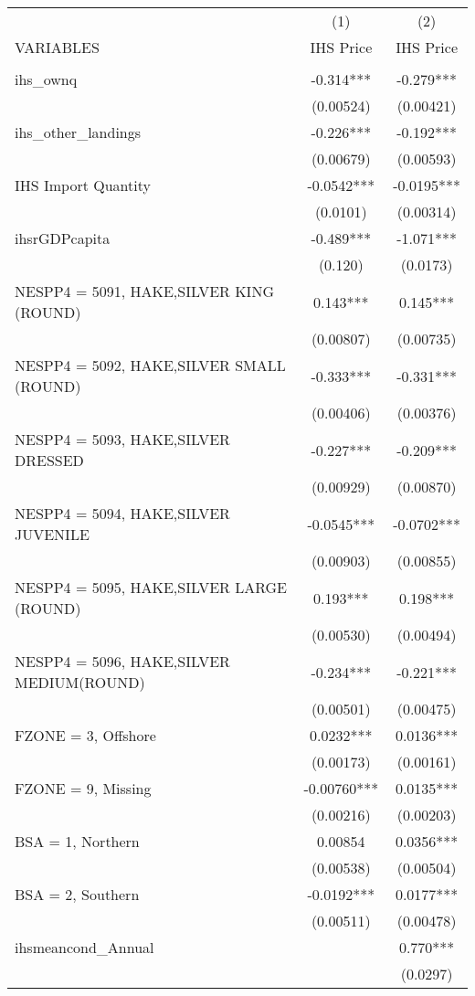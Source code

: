 \begin{tabular}{lcc} \hline
 & (1) & (2) \\
VARIABLES & IHS Price & IHS Price \\ \hline
 &  &  \\
ihs\_ownq & -0.314*** & -0.279*** \\
 & (0.00524) & (0.00421) \\
ihs\_other\_landings & -0.226*** & -0.192*** \\
 & (0.00679) & (0.00593) \\
IHS Import Quantity & -0.0542*** & -0.0195*** \\
 & (0.0101) & (0.00314) \\
ihsrGDPcapita & -0.489*** & -1.071*** \\
 & (0.120) & (0.0173) \\
NESPP4 = 5091, HAKE,SILVER KING (ROUND) & 0.143*** & 0.145*** \\
 & (0.00807) & (0.00735) \\
NESPP4 = 5092, HAKE,SILVER SMALL (ROUND) & -0.333*** & -0.331*** \\
 & (0.00406) & (0.00376) \\
NESPP4 = 5093, HAKE,SILVER DRESSED & -0.227*** & -0.209*** \\
 & (0.00929) & (0.00870) \\
NESPP4 = 5094, HAKE,SILVER JUVENILE & -0.0545*** & -0.0702*** \\
 & (0.00903) & (0.00855) \\
NESPP4 = 5095, HAKE,SILVER LARGE (ROUND) & 0.193*** & 0.198*** \\
 & (0.00530) & (0.00494) \\
NESPP4 = 5096, HAKE,SILVER MEDIUM(ROUND) & -0.234*** & -0.221*** \\
 & (0.00501) & (0.00475) \\
FZONE = 3, Offshore & 0.0232*** & 0.0136*** \\
 & (0.00173) & (0.00161) \\
FZONE = 9, Missing & -0.00760*** & 0.0135*** \\
 & (0.00216) & (0.00203) \\
BSA = 1, Northern & 0.00854 & 0.0356*** \\
 & (0.00538) & (0.00504) \\
BSA = 2, Southern & -0.0192*** & 0.0177*** \\
 & (0.00511) & (0.00478) \\
ihsmeancond\_Annual &  & 0.770*** \\
 &  & (0.0297) \\

\end{tabular}
